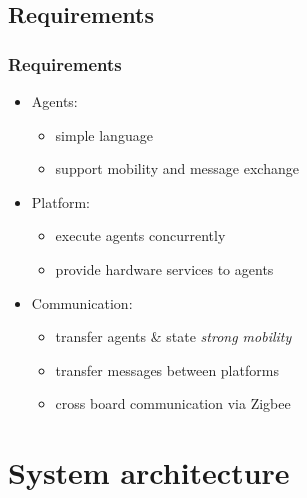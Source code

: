 \documentclass{beamer}
\theoremstyle{definition} \newtheorem{mdefinition}{Definition}
\theoremstyle{plain} \newtheorem{mtheorem}{Theorem}
\theoremstyle{plain} \newtheorem{mcorollary}{Corollary}
\theoremstyle{plain} \newtheorem{mfact}{Fact}
\begin{document}
\subsection{Requirements}
\begin{frame}
	\frametitle{Requirements}

\begin{itemize}
	\item Agents:
	\begin{itemize}
		\item simple language 
		\item support mobility and message exchange
	\end{itemize} 
	\item Platform:
	\begin{itemize}
		\item execute agents concurrently
		\item provide hardware services to agents
	\end{itemize}	
	\item Communication:
	\begin{itemize}
		\item transfer agents \& state {\it strong mobility}
		\item transfer messages between platforms
		\item cross board communication via Zigbee
	\end{itemize}
\end{itemize}
\end{frame}

\section{System architecture}
\end{document}
